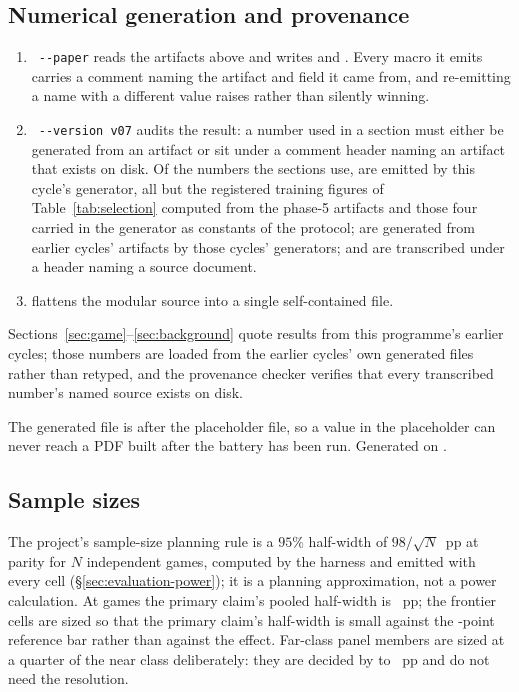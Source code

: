 \subsection*{Numerical generation and provenance}

\begin{enumerate}
\item {}~\texttt{-{}-paper} reads the artifacts above and writes
   and . Every macro it
  emits carries a comment naming the artifact and field it came from, and re-emitting a name with a
  different value raises rather than silently winning.
\item {}~\texttt{-{}-version v07} audits the result: a number used in a section
  must either be generated from an artifact or sit under a comment header naming an artifact that
  exists on disk. Of the numbers the sections use, \vsevenProvGenerated{} are emitted by this
  cycle's generator, all but the registered training figures of Table~\ref{tab:selection} computed
  from the phase-5 artifacts and those four carried in the generator as constants of the protocol;
  \vsevenProvInherited{} are generated from earlier cycles' artifacts by those cycles' generators;
  and \vsevenProvTranscribed{} are transcribed under a header naming a source document.
\item {} flattens the modular source into a single self-contained file.
\end{enumerate}

Sections~\ref{sec:game}--\ref{sec:background} quote results from this programme's earlier cycles;
those numbers are loaded from the earlier cycles' own generated files rather than retyped, and the
provenance checker verifies that every transcribed number's named source exists on disk.

The generated file is \verb|| after the placeholder file, so a value in the placeholder can never
reach a PDF built after the battery has been run. Generated on \vsevenBuildDate{}.

\subsection*{Sample sizes}

The project's sample-size planning rule is a $95\%$ half-width of $98/\sqrt{N}$~pp at parity for
$N$ independent games, computed by the harness and emitted with every cell
(\S\ref{sec:evaluation-power}); it is a planning approximation, not a power calculation. At
\vsevenBtwoFcheapN{} games the primary claim's pooled half-width is
\vsevenBtwoFcheapHalfWidth{}~pp; the frontier cells are sized so that the primary claim's
half-width is small against the \vsevenPrimaryFloor{}-point reference bar rather than against the
effect. Far-class panel members are
sized at a quarter of the near class deliberately: they are decided by \vsevenFarSpanLo{} to \vsevenFarSpanHi{}~pp
and do not need the resolution.
